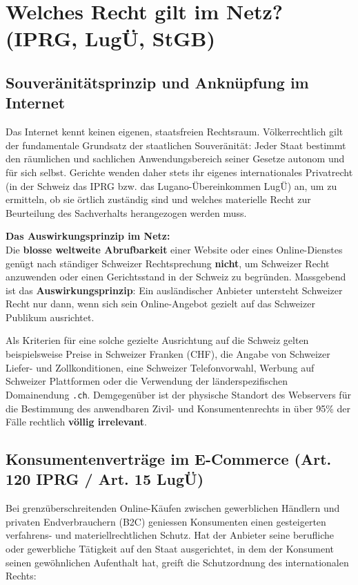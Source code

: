 \section{Welches Recht gilt im Netz? (IPRG, LugÜ, StGB)}

\subsection{Souveränitätsprinzip und Anknüpfung im Internet}

Das Internet kennt keinen eigenen, staatsfreien Rechtsraum. Völkerrechtlich gilt der fundamentale Grundsatz der staatlichen Souveränität: Jeder Staat bestimmt den räumlichen und sachlichen Anwendungsbereich seiner Gesetze autonom und für sich selbst. Gerichte wenden daher stets ihr eigenes internationales Privatrecht (in der Schweiz das IPRG bzw. das Lugano-Übereinkommen LugÜ) an, um zu ermitteln, ob sie örtlich zuständig sind und welches materielle Recht zur Beurteilung des Sachverhalts herangezogen werden muss.

\begin{theorem}
    \textbf{Das Auswirkungsprinzip im Netz:} \\
    Die \textbf{blosse weltweite Abrufbarkeit} einer Website oder eines Online-Dienstes genügt nach ständiger Schweizer Rechtsprechung \textbf{nicht}, um Schweizer Recht anzuwenden oder einen Gerichtsstand in der Schweiz zu begründen. Massgebend ist das \textbf{Auswirkungsprinzip}: Ein ausländischer Anbieter untersteht Schweizer Recht nur dann, wenn sich sein Online-Angebot gezielt auf das Schweizer Publikum ausrichtet.
\end{theorem}

Als Kriterien für eine solche gezielte Ausrichtung auf die Schweiz gelten beispielsweise Preise in Schweizer Franken (CHF), die Angabe von Schweizer Liefer- und Zollkonditionen, eine Schweizer Telefonvorwahl, Werbung auf Schweizer Plattformen oder die Verwendung der länderspezifischen Domainendung \texttt{.ch}. Demgegenüber ist der physische Standort des Webservers für die Bestimmung des anwendbaren Zivil- und Konsumentenrechts in über 95\% der Fälle rechtlich \textbf{völlig irrelevant}.

\subsection{Konsumentenverträge im E-Commerce (Art. 120 IPRG / Art. 15 LugÜ)}

Bei grenzüberschreitenden Online-Käufen zwischen gewerblichen Händlern und privaten Endverbrauchern (B2C) geniessen Konsumenten einen gesteigerten verfahrens- und materiellrechtlichen Schutz. Hat der Anbieter seine berufliche oder gewerbliche Tätigkeit auf den Staat ausgerichtet, in dem der Konsument seinen gewöhnlichen Aufenthalt hat, greift die Schutzordnung des internationalen Rechts:

